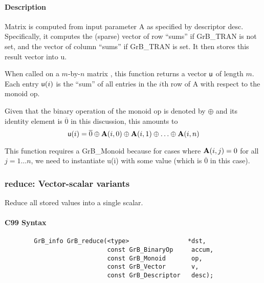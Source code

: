 \paragraph{Description}

Matrix  is computed from input parameter {\sf A} as specified
by descriptor {\sf desc}. Specifically, it computes the (sparse) vector of row ``sums'' if 
GrB\_TRAN  is not set, and the vector of column ``sums'' if GrB\_TRAN  is set. It then
stores this result vector into {\sf u}. 

When called on a $m$-by-$n$ matrix , this function returns a vector ${\sf u}$ 
of length $m$. Each entry ${\sf u}(i)$ is the ``sum'' of all entries in the $i$th row of 
{\sf A} with respect to the monoid {\sf op}. 

Given that the binary operation of the monoid {\sf op} is denoted by $\oplus$ and its 
identity element is $\overline{0}$ in this discussion, this amounts to $$ {\sf u}(i) = \overline{0} \oplus {\bf A}(i,0) \oplus {\bf A}(i,1) \oplus  \ldots \oplus  {\bf A}(i,n) $$

This function requires a GrB\_Monoid because for cases where ${\bf A}(i,j) = 0$ for 
all $j=1 \ldots n$, we need to instantiate {\sf u}(i) with some value (which
is $\overline{0}$ in this case).


\subsubsection{{\sf reduce}: Vector-scalar variants}

Reduce all stored values into a single scalar.





\paragraph{C99 Syntax}

\begin{verbatim}
        GrB_info GrB_reduce(<type>                *dst,
                            const GrB_BinaryOp     accum,
                            const GrB_Monoid       op,
                            const GrB_Vector       v,
                            const GrB_Descriptor   desc);
\end{verbatim}


